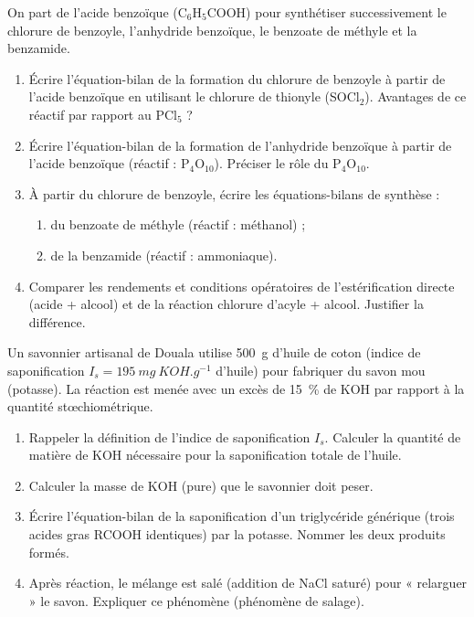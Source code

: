 \documentclass[11pt]{article}
\begin{document}
\begin{exercice}
On part de l'acide benzoïque (C$_6$H$_5$COOH) pour synthétiser successivement le chlorure de benzoyle, l'anhydride benzoïque, le benzoate de méthyle et la benzamide.
\begin{enumerate}
    \item Écrire l'équation-bilan de la formation du chlorure de benzoyle à partir de l'acide benzoïque en utilisant le chlorure de thionyle (SOCl$_2$). Avantages de ce réactif par rapport au PCl$_5$ ?
    \item Écrire l'équation-bilan de la formation de l'anhydride benzoïque à partir de l'acide benzoïque (réactif : P$_4$O$_{10}$). Préciser le rôle du P$_4$O$_{10}$.
    \item À partir du chlorure de benzoyle, écrire les équations-bilans de synthèse :
    \begin{enumerate}
        \item du benzoate de méthyle (réactif : méthanol) ;
        \item de la benzamide (réactif : ammoniaque).
    \end{enumerate}
    \item Comparer les rendements et conditions opératoires de l'estérification directe (acide + alcool) et de la réaction chlorure d'acyle + alcool. Justifier la différence.
\end{enumerate}
\end{exercice}

\begin{exercice}
Un savonnier artisanal de Douala utilise \SI{500}{g} d'huile de coton (indice de saponification $I_s = \SI{195}{mg\ KOH.g^{-1}}$ d'huile) pour fabriquer du savon mou (potasse). La réaction est menée avec un excès de \SI{15}{\%} de KOH par rapport à la quantité stœchiométrique.
\begin{enumerate}
    \item Rappeler la définition de l'indice de saponification $I_s$. Calculer la quantité de matière de KOH nécessaire pour la saponification totale de l'huile.
    \item Calculer la masse de KOH (pure) que le savonnier doit peser.
    \item Écrire l'équation-bilan de la saponification d'un triglycéride générique (trois acides gras RCOOH identiques) par la potasse. Nommer les deux produits formés.
    \item Après réaction, le mélange est salé (addition de NaCl saturé) pour « relarguer » le savon. Expliquer ce phénomène (phénomène de salage).
\end{enumerate}
\end{exercice}
\end{document}
